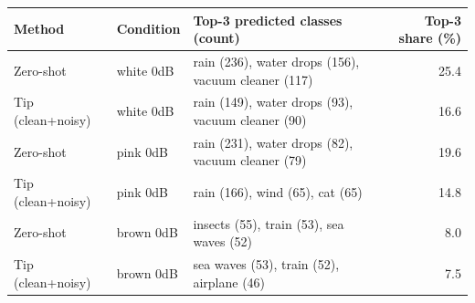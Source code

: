 \begin{tabular}{llp{7.2cm}r}
\toprule
Method & Condition & Top-3 predicted classes (count) & Top-3 share (\%) \\
\midrule
Zero-shot & white 0dB & rain (236), water drops (156), vacuum cleaner (117) & 25.4 \\
Tip (clean+noisy) & white 0dB & rain (149), water drops (93), vacuum cleaner (90) & 16.6 \\
Zero-shot & pink 0dB & rain (231), water drops (82), vacuum cleaner (79) & 19.6 \\
Tip (clean+noisy) & pink 0dB & rain (166), wind (65), cat (65) & 14.8 \\
Zero-shot & brown 0dB & insects (55), train (53), sea waves (52) & 8.0 \\
Tip (clean+noisy) & brown 0dB & sea waves (53), train (52), airplane (46) & 7.5 \\
\bottomrule
\end{tabular}
